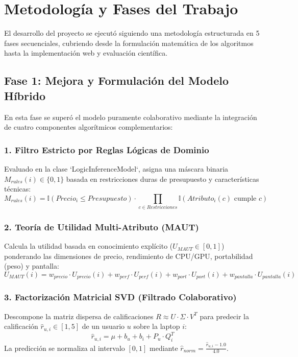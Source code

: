 \chapter{Metodología y Fases del Trabajo}

El desarrollo del proyecto se ejecutó siguiendo una metodología estructurada en 5 fases secuenciales, cubriendo desde la formulación matemática de los algoritmos hasta la implementación web y evaluación científica.

\section{Fase 1: Mejora y Formulación del Modelo Híbrido}
En esta fase se superó el modelo puramente colaborativo mediante la integración de cuatro componentes algorítmicos complementarios:

\subsection{1. Filtro Estricto por Reglas Lógicas de Dominio}
Evaluado en la clase `LogicInferenceModel`, asigna una máscara binaria $M_{rules}(i) \in \{0, 1\}$ basada en restricciones duras de presupuesto y características técnicas:
\begin{equation}
M_{rules}(i) = \mathbb{I}(Precio_i \le Presupuesto) \cdot \prod_{c \in Restricciones} \mathbb{I}(Atributo_i(c) \text{ cumple } c)
\end{equation}

\subsection{2. Teoría de Utilidad Multi-Atributo (MAUT)}
Calcula la utilidad basada en conocimiento explícito ($U_{MAUT} \in [0, 1]$) ponderando las dimensiones de precio, rendimiento de CPU/GPU, portabilidad (peso) y pantalla:
\begin{equation}
U_{MAUT}(i) = w_{precio} \cdot U_{precio}(i) + w_{perf} \cdot U_{perf}(i) + w_{port} \cdot U_{port}(i) + w_{pantalla} \cdot U_{pantalla}(i)
\end{equation}

\subsection{3. Factorización Matricial SVD (Filtrado Colaborativo)}
Descompone la matriz dispersa de calificaciones $R \approx U \cdot \Sigma \cdot V^T$ para predecir la calificación $\hat{r}_{u,i} \in [1, 5]$ de un usuario $u$ sobre la laptop $i$:
\begin{equation}
\hat{r}_{u,i} = \mu + b_u + b_i + P_u \cdot Q_i^T
\end{equation}
La predicción se normaliza al intervalo $[0, 1]$ mediante $\hat{r}_{norm} = \frac{\hat{r}_{u,i} - 1.0}{4.0}$.

